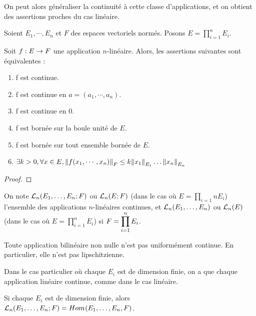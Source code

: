 On peut alors généraliser la continuité à cette classe d'applications, et on
obtient des assertions proches du cas linéaire.

\begin{proposition}
	Soient $E_{1}, \cdots, E_{n}$ et $F$ des espaces vectoriels normés. Posons
	$E = \displaystyle \prod_{i = 1}^{n} E_{i}$.

	Soit $\GSfunction{f}{E}{F}$ une application $n$-linéaire.
	Alors, les assertions suivantes sont équivalentes :

	\begin{enumerate}
		\item f est continue.
		\item f est continue en $a = (a_{1}, \cdots, a_{n})$.
		\item f est continue en $0$.
		\item f est bornée sur la boule unité de $E$.
		\item f est bornée sur tout ensemble bornée de $E$.
		\item $\exists k > 0, \forall x \in E, \GSnormeDef{f(x_{1}, \cdots,
			x_{n})}{F} \leq k \GSnormeDef{x_{1}}{E_{1}} \ldots
			\GSnormeDef{x_{n}}{E_{n}}$
	\end{enumerate}
\end{proposition}

\ifdefined\outputproof
\begin{proof}

\end{proof}
\fi

On note $\GScontinueHomo[n]{E_{1}, \ldots, E_{n}}{F}$ ou
$\GScontinueHomo[n]{E}{F}$ (dans le cas où $E = \prod_{i = 1}{n} E_{i}$) l'ensemble des applications
$n$-linéaires continues, et $\GScontinueEndo[n]{E_{1}, \ldots, E_{n}}$ ou
$\GScontinueEndo[n]{E}$ (dans le cas où $E = \prod_{i = 1}^{n} E_{i}$) si $F =
\GSprodSet{i}{1}{n}{E}$.

\begin{remarque}
	Toute application bilinéaire non nulle n'est pas uniformément continue. En
	particulier, elle n'est pas lipschitzienne.
\end{remarque}

Dans le cas particulier où chaque $E_{i}$ est de dimension finie, on a que
chaque application linéaire continue, comme dans le cas linéaire.

\begin{proposition}
	Si chaque $E_{i}$ est de dimension finie, alors $\GScontinueHomo[n]{E_{1},
	\ldots, E_{n}}{F} = \GShomomorphisme{E_{1}, \ldots, E_{n}}{F}$.
\end{proposition}

